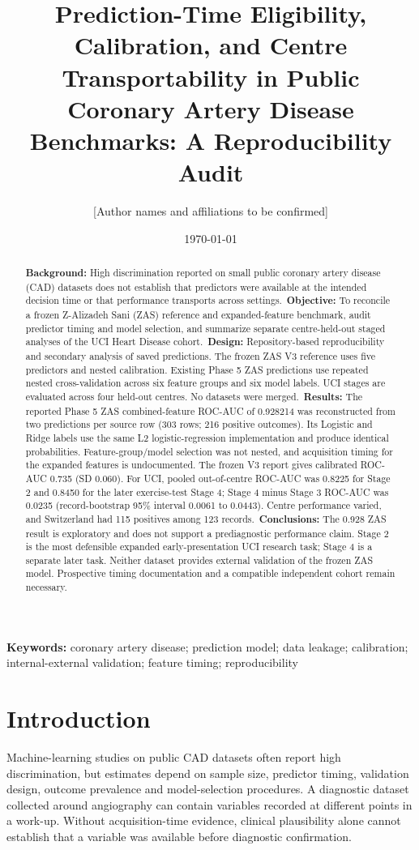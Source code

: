 \documentclass[11pt]{article}
\title{Prediction-Time Eligibility, Calibration, and Centre Transportability in Public Coronary Artery Disease Benchmarks: A Reproducibility Audit}
\author{[Author names and affiliations to be confirmed]}
\date{\today}
\begin{document}
\maketitle

\begin{abstract}
\noindent\textbf{Background:} High discrimination reported on small public coronary artery disease (CAD) datasets does not establish that predictors were available at the intended decision time or that performance transports across settings.\
\textbf{Objective:} To reconcile a frozen Z-Alizadeh Sani (ZAS) reference and expanded-feature benchmark, audit predictor timing and model selection, and summarize separate centre-held-out staged analyses of the UCI Heart Disease cohort.\
\textbf{Design:} Repository-based reproducibility and secondary analysis of saved predictions. The frozen ZAS V3 reference uses five predictors and nested calibration. Existing Phase 5 ZAS predictions use repeated nested cross-validation across six feature groups and six model labels. UCI stages are evaluated across four held-out centres. No datasets were merged.\
\textbf{Results:} The reported Phase 5 ZAS combined-feature ROC-AUC of 0.928214 was reconstructed from two predictions per source row (303 rows; 216 positive outcomes). Its Logistic and Ridge labels use the same L2 logistic-regression implementation and produce identical probabilities. Feature-group/model selection was not nested, and acquisition timing for the expanded features is undocumented. The frozen V3 report gives calibrated ROC-AUC 0.735 (SD 0.060). For UCI, pooled out-of-centre ROC-AUC was 0.8225 for Stage 2 and 0.8450 for the later exercise-test Stage 4; Stage 4 minus Stage 3 ROC-AUC was 0.0235 (record-bootstrap 95\% interval 0.0061 to 0.0443). Centre performance varied, and Switzerland had 115 positives among 123 records.\
\textbf{Conclusions:} The 0.928 ZAS result is exploratory and does not support a prediagnostic performance claim. Stage 2 is the most defensible expanded early-presentation UCI research task; Stage 4 is a separate later task. Neither dataset provides external validation of the frozen ZAS model. Prospective timing documentation and a compatible independent cohort remain necessary.
\end{abstract}

\noindent\textbf{Keywords:} coronary artery disease; prediction model; data leakage; calibration; internal-external validation; feature timing; reproducibility

\section{Introduction}
Machine-learning studies on public CAD datasets often report high discrimination, but estimates depend on sample size, predictor timing, validation design, outcome prevalence and model-selection procedures. A diagnostic dataset collected around angiography can contain variables recorded at different points in a work-up. Without acquisition-time evidence, clinical plausibility alone cannot establish that a variable was available before diagnostic confirmation.
\end{document}
